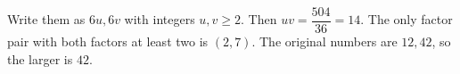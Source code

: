 Write them as $6u,6v$ with integers $u,v\ge2$. Then $uv=\dfrac{504}{36}=14$. The only factor pair with both factors at least two is $(2,7)$. The original numbers are $12,42$, so the larger is $\boxed{42}$.
